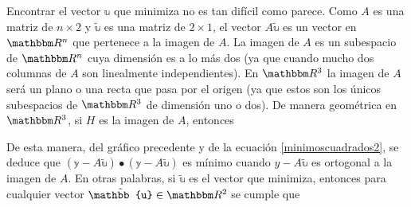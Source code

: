 Encontrar el vector $\mathbb{u}$ que minimiza no es tan difícil como parece. Como $A$ es una matriz de $n \times 2$ y $\tilde{\mathbb{u}}$ es una matriz de $2 \times 1$, el vector $A\tilde{\mathbb{u}}$ es un vector en $\RR[n]$ que pertenece a la imagen de $A$. La imagen de $A$ es un subespacio de $\RR[n]$ cuya dimensión es a lo más dos (ya que cuando mucho dos columnas de $A$ son linealmente independientes). En $\RR[3]$ la imagen de $A$ será un plano o una recta que pasa por el origen (ya que estos son los únicos subespacios de $\RR[3]$ de dimensión uno o dos). De manera geométrica en $\RR[3]$, si $H$ es la imagen de $A$, entonces
\begin{center}
\end{center}\newpage
De esta manera, del gráfico precedente y de la ecuación \eqref{minimoscuadrados2}, se deduce que $(\mathbb{y} - A \tilde{\mathbb{u}}) \bullet (\mathbb{y} - A \tilde{\mathbb{u}})$ es mínimo cuando $y - A\tilde{\mathbb{u}}$ es ortogonal a la imagen de $A$. En otras palabras, si $\tilde{\mathbb{u}}$ es el vector que minimiza, entonces para cualquier vector $\tilde{\mathbb{u}} \in \RR[2]$ se cumple que
